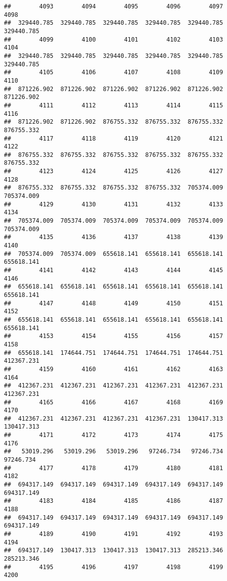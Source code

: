 \documentclass[
]{book}
\begin{document}
\begin{verbatim}
##        4093        4094        4095        4096        4097        4098 
##  329440.785  329440.785  329440.785  329440.785  329440.785  329440.785 
##        4099        4100        4101        4102        4103        4104 
##  329440.785  329440.785  329440.785  329440.785  329440.785  329440.785 
##        4105        4106        4107        4108        4109        4110 
##  871226.902  871226.902  871226.902  871226.902  871226.902  871226.902 
##        4111        4112        4113        4114        4115        4116 
##  871226.902  871226.902  876755.332  876755.332  876755.332  876755.332 
##        4117        4118        4119        4120        4121        4122 
##  876755.332  876755.332  876755.332  876755.332  876755.332  876755.332 
##        4123        4124        4125        4126        4127        4128 
##  876755.332  876755.332  876755.332  876755.332  705374.009  705374.009 
##        4129        4130        4131        4132        4133        4134 
##  705374.009  705374.009  705374.009  705374.009  705374.009  705374.009 
##        4135        4136        4137        4138        4139        4140 
##  705374.009  705374.009  655618.141  655618.141  655618.141  655618.141 
##        4141        4142        4143        4144        4145        4146 
##  655618.141  655618.141  655618.141  655618.141  655618.141  655618.141 
##        4147        4148        4149        4150        4151        4152 
##  655618.141  655618.141  655618.141  655618.141  655618.141  655618.141 
##        4153        4154        4155        4156        4157        4158 
##  655618.141  174644.751  174644.751  174644.751  174644.751  412367.231 
##        4159        4160        4161        4162        4163        4164 
##  412367.231  412367.231  412367.231  412367.231  412367.231  412367.231 
##        4165        4166        4167        4168        4169        4170 
##  412367.231  412367.231  412367.231  412367.231  130417.313  130417.313 
##        4171        4172        4173        4174        4175        4176 
##   53019.296   53019.296   53019.296   97246.734   97246.734   97246.734 
##        4177        4178        4179        4180        4181        4182 
##  694317.149  694317.149  694317.149  694317.149  694317.149  694317.149 
##        4183        4184        4185        4186        4187        4188 
##  694317.149  694317.149  694317.149  694317.149  694317.149  694317.149 
##        4189        4190        4191        4192        4193        4194 
##  694317.149  130417.313  130417.313  130417.313  285213.346  285213.346 
##        4195        4196        4197        4198        4199        4200 

\end{verbatim}
\end{document}

